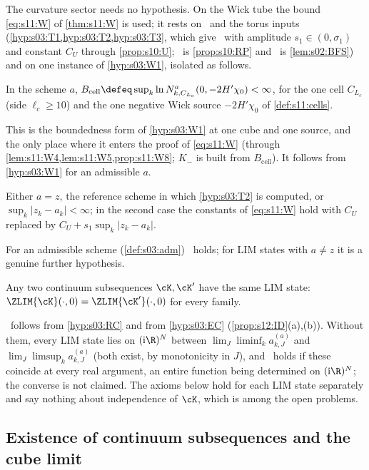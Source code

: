 The curvature sector needs no hypothesis. On the Wick tube the bound \eqref{eq:s11:W} of \cref{thm:s11:W} is used; it rests on \Tthree\ and the torus inputs (\cref{hyp:s03:T1,hyp:s03:T2,hyp:s03:T3}, which give \Itwo\ with amplitude $s_1\in(0,\sigma_1)$ and constant $C_U$ through \cref{prop:s10:U}; \Ithree\ is \cref{prop:s10:RP} and \Ifour\ is \cref{lem:s02:BFS}) and on one instance of \cref{hyp:s03:W1}, isolated as follows.

\begin{hypothesis}\label{hyp:s12:Bcell}
In the scheme $a$, $B_{\mathrm{cell}}\defeq\sup_k\ln N^a_{k,C_{L_c}}(0,-2H'\chi_0)<\infty$, for the one cell $C_{L_c}$ (side $\ell_c\ge10$) and the one negative Wick source $-2H'\chi_0$ of \cref{def:s11:cells}.
\end{hypothesis}
This is the boundedness form of \cref{hyp:s03:W1} at one cube and one source, and the only place where it enters the proof of \eqref{eq:s11:W} (through \cref{lem:s11:W4,lem:s11:W5,prop:s11:W8}; $K_-$ is built from $B_{\mathrm{cell}}$). It follows from \cref{hyp:s03:W1} for an admissible $a$.

\begin{hypothesis}\label{hyp:s12:SCH}
Either $a=z$, the reference scheme in which \cref{hyp:s03:T2} is computed, or $\sup_k|z_k-a_k|<\infty$; in the second case the constants of \eqref{eq:s11:W} hold with $C_U$ replaced by $C_U+s_1\sup_k|z_k-a_k|$.
\end{hypothesis}
For an admissible scheme (\cref{def:s03:adm}) \SCH\ holds; for LIM states with $a\ne z$ it is a genuine further hypothesis.

\begin{hypothesis}\label{hyp:s12:UNIQ}
Any two continuum subsequences $\cK,\cK'$ have the same LIM state: $\ZLIM{\cK}(\cdot,0)=\ZLIM{\cK'}(\cdot,0)$ for every family.
\end{hypothesis}
\UNIQ\ follows from \cref{hyp:s03:RC} and from \cref{hyp:s03:EC} (\cref{prop:s12:ID}(a),(b)). Without them, every LIM state lies on $(\mathrm i\R)^N$ between $\lim_J\liminf_ka^{(a)}_{k,J}$ and $\lim_J\limsup_ka^{(a)}_{k,J}$ (both exist, by monotonicity in $J$), and \UNIQ\ holds if these coincide at every real argument, an entire function being determined on $(\mathrm i\R)^N$; the converse is not claimed. The axioms below hold for each LIM state separately and say nothing about independence of $\cK$, which is among the open problems.

\subsection{Existence of continuum subsequences and the cube limit}

